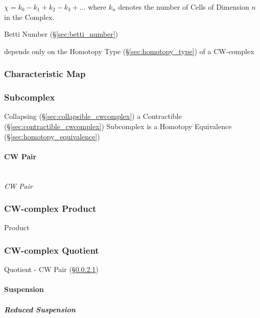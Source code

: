 $\chi = k_0 - k_1 + k_2 - k_3 + \ldots$ where $k_n$ denotes the number
of Cells of Dimension $n$ in the Complex.

Betti Number (\S\ref{sec:betti_number})

depends only on the Homotopy Type (\S\ref{sec:homotopy_type}) of a
CW-complex \cite{hatcher02}



\subsubsection{Characteristic Map}\label{sec:characteristic_map}

\subsubsection{Subcomplex}\label{sec:subcomplex}

Collapsing (\S\ref{sec:collapsible_cwcomplex}) a Contractible
(\S\ref{sec:contractible_cwcomplex}) Subcomplex is a Homotopy
Equivalence (\S\ref{sec:homotopy_equivalence})



\paragraph{CW Pair}\label{sec:cw_pair}
\hfill \\

\emph{CW Pair}



\subsubsection{CW-complex Product}\label{sec:cwcomplex_product}

Product



\subsubsection{CW-complex Quotient}\label{sec:cwcomplex_quotient}

Quotient - CW Pair (\S\ref{sec:cw_pair})



\paragraph{Suspension}\label{sec:suspension}

\subparagraph{Reduced Suspension}\label{sec:reduced_suspension}



